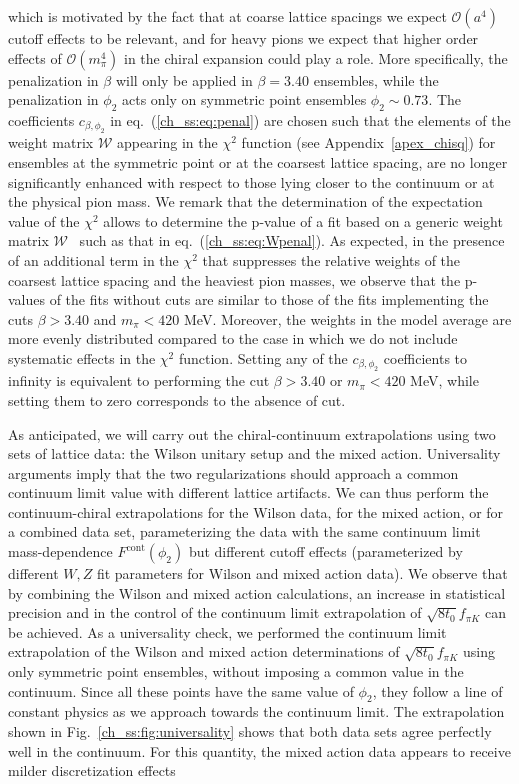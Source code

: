 which is motivated by the fact that at coarse lattice spacings we expect $\mathcal{O}(a^4)$ cutoff effects to be relevant, and for heavy pions we expect that higher order effects of $\mathcal{O}(m_{\pi}^4)$ in the chiral expansion could play a role. More specifically, the penalization in $\beta$ will only be applied in $\beta=3.40$ ensembles, while the penalization in $\phi_2$ acts only on symmetric point ensembles $\phi_2\sim0.73$. The coefficients $c_{\beta,\phi_2}$ in eq.~(\ref{ch_ss:eq:penal}) are chosen such that the elements of the weight matrix $\mathcal{W}$ appearing in the $\chi^2$ function (see Appendix~\ref{apex_chisq}) for ensembles at the symmetric point or at the coarsest lattice spacing, are no longer significantly enhanced with respect to those  lying closer to the continuum or at the physical pion mass. We remark that the determination of the expectation value of the $\chi^2$ allows to determine the p-value of a fit based on a generic weight matrix $\mathcal{W}$~\citep{Bruno:2022mfy} such as that in eq.~(\ref{ch_ss:eq:Wpenal}). As expected, in the presence of an additional term in the $\chi^2$ that suppresses the relative weights of the coarsest lattice spacing and the heaviest pion masses, we observe that the p-values of the fits without cuts are similar to those of the fits implementing the cuts $\beta>3.40$ and $m_{\pi}<420$ MeV. Moreover, the weights in the model average are more evenly distributed compared to the case in which we do not include systematic effects in the $\chi^2$ function. Setting any of the $c_{\beta,\phi_2}$ coefficients to infinity is equivalent to performing the cut $\beta>3.40$ or $m_{\pi}<420$ MeV, while setting them to zero corresponds to the absence of cut.

As anticipated, we will carry out the chiral-continuum extrapolations using two sets of lattice data: the Wilson unitary setup and the mixed action. Universality arguments imply that the two regularizations should approach a common continuum limit value with different lattice artifacts. We can thus perform the continuum-chiral extrapolations for the Wilson data, for the mixed action, or for a combined data set, parameterizing the data with the same continuum limit mass-dependence $F^{\textrm{cont}}(\phi_2)$ but different cutoff effects (parameterized by different $W,Z$ fit parameters for Wilson and mixed action data). We observe that by combining the Wilson and mixed action calculations, an increase in statistical precision and in the control of the continuum limit extrapolation of $\sqrt{8t_0}f_{\pi K}$ can be achieved. As a universality check, we performed the continuum limit extrapolation of the Wilson and mixed action determinations of $\sqrt{8t_0}f_{\pi K}$ using only symmetric point ensembles, without imposing a common value in the continuum. Since all these points have the same value of $\phi_2$, they follow a line of constant physics as we approach towards the continuum limit. The extrapolation shown in Fig.~\ref{ch_ss:fig:universality} shows that both data sets agree perfectly well in the continuum. For this quantity, the mixed action data appears to receive milder discretization effects


